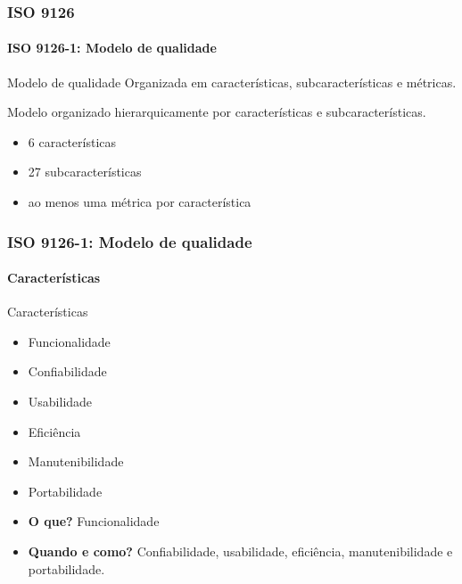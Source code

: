 \begin{frame}[hasnext=false, hasprev=true]
	\frametitle{ISO 9126}
	\framesubtitle{ISO 9126-1: Modelo de qualidade}
	
	\begin{block:fact}{Modelo de qualidade}
		Organizada em características, subcaracterísticas e métricas.
	\end{block:fact}
	
	\begin{block:fact}{}
		Modelo organizado hierarquicamente por características e subcaracterísticas.
		\begin{itemize}
			\item 6 características
			\item 27 subcaracterísticas
			\item ao menos uma métrica por característica
		\end{itemize}
	\end{block:fact}
\end{frame}


\begin{frame}
	\frametitle{ISO 9126-1: Modelo de qualidade}
	\framesubtitle{Características}
	
	\begin{block:fact}{Características}
		\begin{itemize}
			\item Funcionalidade
			\item Confiabilidade
			\item Usabilidade
			\item Eficiência
			\item Manutenibilidade
			\item Portabilidade
		\end{itemize}
	\end{block:fact}

	\begin{block:fact}{}
		\begin{itemize}
			\item \textbf{O que?} Funcionalidade
			\item\textbf{ Quando e como?} Confiabilidade, usabilidade, eficiência,
			manutenibilidade e portabilidade.
		\end{itemize}
	\end{block:fact}
\end{frame}


